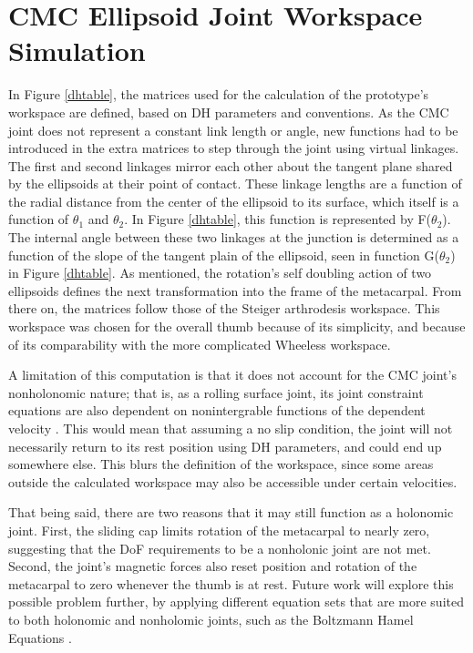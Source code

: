 \documentclass[letterpaper, 10 pt, conference]{ieeeconf}  %
\newcommand{\rFig}[1]{Figure \ref{#1}}
\begin{document}
\section{CMC Ellipsoid Joint Workspace Simulation}

In \rFig{dhtable}, the matrices used for the calculation of the prototype's workspace are defined, based on DH parameters and conventions. As the CMC joint does not represent a constant link length or angle, new functions had to be introduced in the extra matrices to step through the joint using virtual linkages. The first and second linkages mirror each other about the tangent plane shared by the ellipsoids at their point of contact. These linkage lengths are a function of the radial distance from the center of the ellipsoid to its surface, which itself is a function of $\theta_1$ and $\theta_2$. In \rFig{dhtable}, this function is represented by F($\theta_2$). The internal angle between these two linkages at the junction is determined as a function of the slope of the tangent plain of the ellipsoid, seen in function G($\theta_2$) in \rFig{dhtable}. As mentioned, the rotation's self doubling action of two ellipsoids defines the next transformation into the frame of the metacarpal. From there on, the matrices follow those of the Steiger arthrodesis workspace. This workspace was chosen for the overall thumb because of its simplicity, and because of its comparability with the more complicated Wheeless workspace.

A limitation of this  computation is that it does not account for the CMC joint's nonholonomic nature; that is, as a rolling surface joint, its joint constraint equations are also dependent on nonintergrable functions of the dependent velocity \cite{Springer}. This would mean that assuming a no slip condition, the joint will not necessarily return to its rest position using DH parameters, and could end up somewhere else. This blurs the definition of the workspace, since some areas outside the calculated workspace may also be accessible under certain velocities.

That being said, there are two reasons that it may still function as a holonomic joint. First, the sliding cap limits rotation of the metacarpal to nearly zero, suggesting that the DoF requirements to be a nonholonic joint are not met. Second, the joint's magnetic forces also reset position and rotation of the metacarpal to zero whenever the thumb is at rest. Future work will explore this possible problem further, by applying different equation sets that are more suited to both holonomic and nonholomic joints, such as the Boltzmann Hamel Equations \cite{Cameron}.
\end{document}
